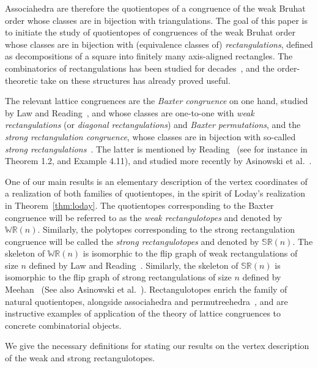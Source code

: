 \documentclass{amsart}
\theoremstyle{definition}
\newcommand{\darkblue}{\color{darkblue}} %
\newcommand{\defn}[1]{\textsl{\darkblue #1}} %
\newcommand{\polytope}[1]{\mathds{#1}} %
\newcommand{\WRP}{\polytope{WR}} %
\newcommand{\SRP}{\polytope{SR}} %
\begin{document}
Associahedra are therefore the quotientopes of a congruence of the weak Bruhat order whose classes are in bijection with triangulations.  
The goal of this paper is to initiate the study of quotientopes of congruences of the weak Bruhat order whose classes are in bijection with (equivalence classes of) \defn{rectangulations}, defined as decompositions of a square into finitely many axis-aligned rectangles. The combinatorics of rectangulations has been studied for decades~\cite{MR2233287,MR2871762,MR2864445,MR2763051,MR3084577,MR3878132,MR4598046}, and the order-theoretic take on these structures has already proved useful.

The relevant lattice congruences are the \defn{Baxter congruence} on one hand, studied by Law and Reading~\cite{MR2871762}, and whose classes are one-to-one with \defn{weak rectangulations} (or \defn{diagonal rectangulations}) and \defn{Baxter permutations}, and the \defn{strong rectangulation congruence}, whose classes are in bijection with so-called \defn{strong rectangulations}~\cite{MR2864445}. The latter is mentioned by Reading~\cite{MR3335492} (see for instance in Theorem 1.2, and Example 4.11), and studied more recently by Asinowski et al.~\cite{ACFF24}.

One of our main results is an elementary description of the vertex coordinates of a realization of both families of quotientopes, in the spirit of Loday's realization in Theorem~\ref{thm:loday}.
The quotientopes corresponding to the Baxter congruence will be referred to as the \defn{weak rectangulotopes} and denoted by $\WRP(n)$. Similarly, the polytopes corresponding to the strong rectangulation congruence will be called the \defn{strong rectangulotopes} and denoted by $\SRP(n)$.
  The skeleton of $\WRP(n)$ is isomorphic to the flip graph of weak rectangulations of size $n$ defined by Law and Reading~\cite{MR2871762}.
Similarly, the skeleton of $\SRP(n)$ is isomorphic to the flip graph of strong rectangulations of size $n$ defined by Meehan~\cite{MR3697823} (See also Asinowski et al.~\cite{ACFF24}).
Rectangulotopes enrich the family of natural quotientopes, alongside associahedra and permutreehedra~\cite{MR3856522}, and are instructive examples of application of the theory of lattice congruences to concrete combinatorial objects.


We give the necessary definitions for stating our results on the vertex description of the weak and strong rectangulotopes.
\end{document}
